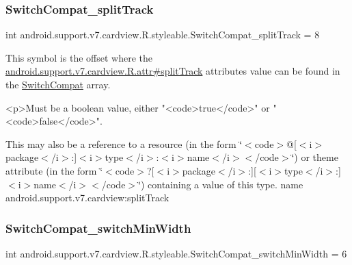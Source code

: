 \subsubsection{\texorpdfstring{Switch\+Compat\+\_\+split\+Track}{SwitchCompat\_splitTrack}}
{\footnotesize\ttfamily int android.\+support.\+v7.\+cardview.\+R.\+styleable.\+Switch\+Compat\+\_\+split\+Track = 8\hspace{0.3cm}{\ttfamily [static]}}

This symbol is the offset where the \hyperlink{classandroid_1_1support_1_1v7_1_1cardview_1_1R_1_1attr_aa85041f3a8ecbfff145615e0ac14f180}{android.\+support.\+v7.\+cardview.\+R.\+attr\#split\+Track} attribute\textquotesingle{}s value can be found in the \hyperlink{classandroid_1_1support_1_1v7_1_1cardview_1_1R_1_1styleable_a8b1fbe9bb91473a7977ff98951ed5255}{Switch\+Compat} array.

\begin{DoxyVerb}      <p>Must be a boolean value, either "<code>true</code>" or "<code>false</code>".
\end{DoxyVerb}
 

This may also be a reference to a resource (in the form \char`\"{}$<$code$>$@\mbox{[}$<$i$>$package$<$/i$>$\+:\mbox{]}$<$i$>$type$<$/i$>$\+:$<$i$>$name$<$/i$>$$<$/code$>$\char`\"{}) or theme attribute (in the form \char`\"{}$<$code$>$?\mbox{[}$<$i$>$package$<$/i$>$\+:\mbox{]}\mbox{[}$<$i$>$type$<$/i$>$\+:\mbox{]}$<$i$>$name$<$/i$>$$<$/code$>$\char`\"{}) containing a value of this type.  name android.\+support.\+v7.\+cardview\+:split\+Track \mbox{\label{classandroid_1_1support_1_1v7_1_1cardview_1_1R_1_1styleable_ae69add4745baa57c245f73ea9040dcec}} 
\subsubsection{\texorpdfstring{Switch\+Compat\+\_\+switch\+Min\+Width}{SwitchCompat\_switchMinWidth}}
{\footnotesize\ttfamily int android.\+support.\+v7.\+cardview.\+R.\+styleable.\+Switch\+Compat\+\_\+switch\+Min\+Width = 6\hspace{0.3cm}{\ttfamily [static]}}

